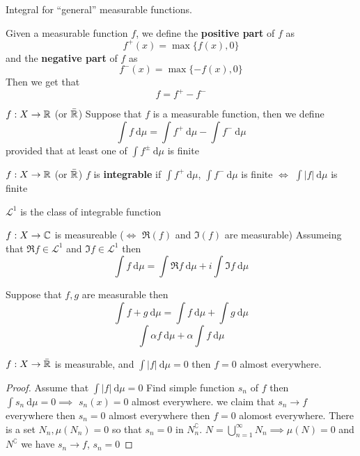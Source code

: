 Integral for ``general'' measurable functions.

\begin{definition}
  Given a measurable function $f$, we define the \textbf{positive part} of $f$ as 
  \[f^+(x) = \max\{f(x), 0\}\]
  and the \textbf{negative part} of $f$ as
  \[f^-(x) = \max\{-f(x), 0\}\]
  Then we get that 
  \[f = f^+ - f^-\]
\end{definition}

\begin{definition}
  $f: X \to \mathbb R$ (or $\bar{\mathbb R}$)
  Suppose that $f$ is a measurable function, then we define
  \[\int f \ \mathrm{d}\mu = \int f^+\ \mathrm{d}\mu - \int f^-\ \mathrm{d}\mu\]
  provided that at least one of $\int f^\pm \ \mathrm{d}\mu$ is finite
\end{definition}
\begin{definition}
  $f: X \to \mathbb R$ (or $\bar{\mathbb R}$)
  $f$ is \textbf{integrable} if $\int f^+ \ \mathrm{d}\mu$, $\int f^- \ \mathrm{d}\mu$ is finite
  $\iff$ $\int |f| \ \mathrm{d}\mu$ is finite

  $\mathcal{L}^1$ is the class of integrable function
\end{definition}

\begin{definition}
$f: X \to \mathbb C$ is measureable ($\iff$ $\Re(f)$ and $\Im(f)$ are measurable)
Assumeing that $\Re f \in \mathcal{L}^1$ and $\Im f \in \mathcal{L}^1$ then
\[\int f\ \mathrm{d}\mu = \int \Re f \ \mathrm{d}\mu + i \int \Im f \ \mathrm{d}\mu\]
\end{definition}

\begin{claim}
  Suppose that $f, g$ are measurable then
  \[\int f + g\ \mathrm{d}\mu  = \int f\ \mathrm{d}\mu + \int g\ \mathrm{d}\mu\]
  \[\int \alpha f \ \mathrm{d}\mu + \alpha \int f \ \mathrm{d}\mu\]
\end{claim}

\begin{lemma}
  $f: X \to \bar{\mathbb R}$ is measurable, and $\int |f| \ \mathrm{d}\mu = 0$ then $f = 0$ almost everywhere.
\end{lemma}

\begin{proof}
  Assume that $\int |f| \ \mathrm{d}\mu = 0$ Find simple function $s_n$ of $f$ then 
  $\int s_n \ \mathrm{d}\mu = 0 \implies$ $s_n(x) = 0$ almost everywhere.
  we claim that $s_n\to f$ everywhere then $s_n = 0$ almost everywhere then $f = 0$ alomost everywhere.
  There is a set $N_n, \mu(N_n) = 0$ so that $s_n = 0$ in $N_n^\complement$. 
  $N = \bigcup_{n=1}^\infty N_n \implies \mu(N) = 0$ and $N^\complement$ we have $s_n \to f$, $s_n = 0$
\end{proof}

